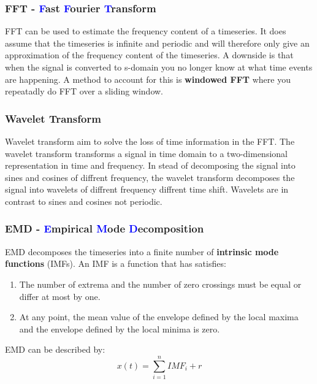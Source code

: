 \subsubsection{FFT - \textcolor{blue}{F}ast \textcolor{blue}{F}ourier \textcolor{blue}{T}ransform}
FFT can be used to estimate the frequency content of a timeseries. It does assume that the timeseries is infinite and periodic and will therefore only give an approximation of the frequency content of the timeseries. A downside is that when the signal is converted to s-domain you no longer know at what time events are happening. A method to account for this is \textbf{windowed FFT} where you repeatadly do FFT over a sliding window. \newline

\subsubsection{Wavelet Transform}
Wavelet transform aim to solve the loss of time information in the FFT. The wavelet transform transforms a signal in time domain to a two-dimensional representation in time and frequency. In stead of decomposing the signal into sines and cosines of diffrent frequency, the wavelet transform decomposes the signal into wavelets of diffrent frequency  diffrent time shift. Wavelets are in contrast to sines and cosines not periodic. 


\subsubsection{EMD - \textcolor{blue}{E}mpirical \textcolor{blue}{M}ode \textcolor{blue}{D}ecomposition}
EMD decomposes the timeseries into a finite number of \textbf{intrinsic mode functions} (IMFs). An IMF is a function that has satisfies:
\begin{enumerate}
    \item The number of extrema and the number of zero crossings must be equal or differ at most by one.
    \item At any point, the mean value of the envelope defined by the local maxima and the envelope defined by the local minima is zero.
\end{enumerate}
EMD can be described by:
\begin{equation}
    x(t) = \sum_{i=1}^{n} IMF_i + r
\end{equation}

